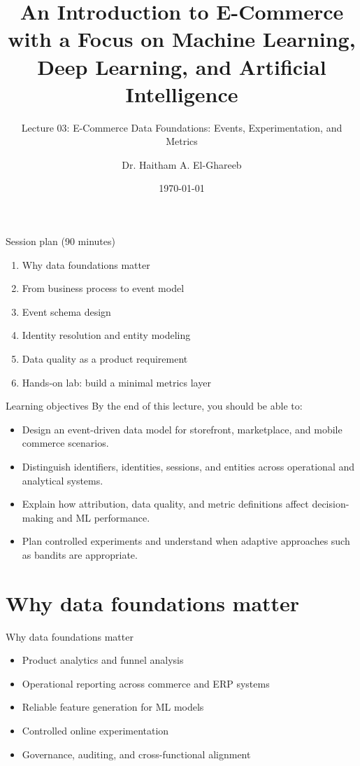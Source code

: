 \documentclass[aspectratio=169]{beamer}
\title[Lecture 03]{An Introduction to E-Commerce\\\small with a Focus on Machine Learning, Deep Learning, and Artificial Intelligence}
\subtitle{Lecture 03: E-Commerce Data Foundations: Events, Experimentation, and Metrics}
\author{Dr. Haitham A. El-Ghareeb}
\institute{Faculty of Computers and Information Sciences \\ Mansoura University \\ Egypt}
\date{\today}
\begin{document}
\begin{frame}
  \titlepage
\end{frame}

\begin{frame}{Session plan (90 minutes)}
  \begin{enumerate}
    \item Why data foundations matter
    \item From business process to event model
    \item Event schema design
    \item Identity resolution and entity modeling
    \item Data quality as a product requirement
    \item Hands-on lab: build a minimal metrics layer
  \end{enumerate}
\end{frame}

\begin{frame}{Learning objectives}
  By the end of this lecture, you should be able to:
  \begin{itemize}
    \item Design an event-driven data model for storefront, marketplace, and mobile commerce scenarios.
    \item Distinguish identifiers, identities, sessions, and entities across operational and analytical systems.
    \item Explain how attribution, data quality, and metric definitions affect decision-making and ML performance.
    \item Plan controlled experiments and understand when adaptive approaches such as bandits are appropriate.
  \end{itemize}
\end{frame}

\section{Why data foundations matter}

\begin{frame}{Why data foundations matter}
  \begin{itemize}
    \item Product analytics and funnel analysis
    \item Operational reporting across commerce and ERP systems
    \item Reliable feature generation for ML models
    \item Controlled online experimentation
    \item Governance, auditing, and cross-functional alignment
  \end{itemize}
\end{frame}
\end{document}
